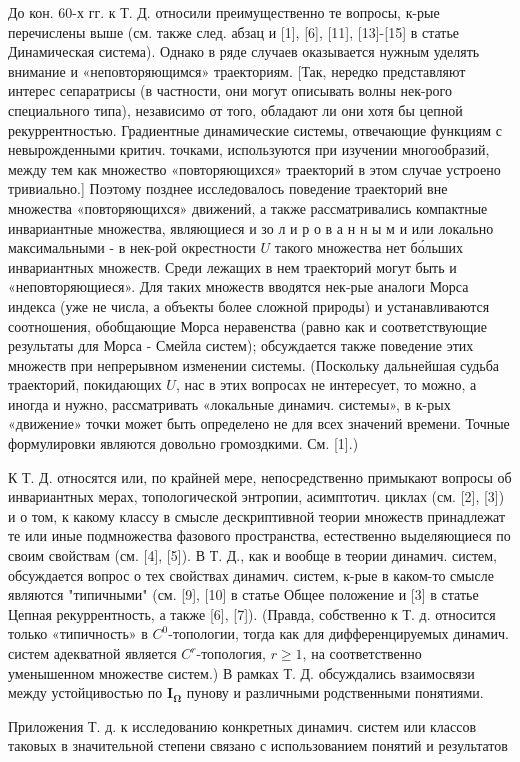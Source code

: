 \documentclass[10pt]{article}
\begin{document}
До кон. 60-х гг. к Т. Д. относили преимущественно те вопросы, к-рые перечислены выше (см. также след. абзац и [1], [6], [11], [13]-[15] в статье Динамическая система). Однако в ряде случаев оказывается нужным уделять внимание и «неповторяющимся» траекториям. [Так, нередко представляют интерес сепаратрисы (в частности, они могут описывать волны нек-рого специального типа), независимо от того, обладают ли они хотя бы цепной рекуррентностью. Градиентные динамические системы, отвечающие функциям с невырожденными критич. точками, используются при изучении многообразий, между тем как множество «повторяющихся» траекторий в этом случае устроено тривиально.] Поэтому позднее исследовалось поведение траекторий вне множества «повторяющихся» движений, а также рассматривались компактные инвариантные множества, являющиеся и зо л и р о в а н н ы м и или локально максимальными - в нек-рой окрестности $U$ такого множества нет бо́льших инвариантных множеств. Среди лежащих в нем траекторий могут быть и «неповторяющиеся». Для таких множеств вводятся нек-рые аналоги Морса индекса (уже не числа, а объекты более сложной природы) и устанавливаются соотношения, обобщающие Морса неравенства (равно как и соответствующие результаты для Морса - Смейла систем); обсуждается также поведение этих множеств при непрерывном изменении системы. (Поскольку дальнейшая судьба траекторий, покидающих $U$, нас в этих вопросах не интересует, то можно, а иногда и нужно, рассматривать «локальные динамич. системы», в к-рых «движение» точки может быть определено не для всех значений времени. Точные формулировки являются довольно громоздкими. См. [1].)



К Т. Д. относятся или, по крайней мере, непосредственно примыкают вопросы об инвариантных мерах, топологической энтропии, асимптотич. циклах (см. [2], [3]) и о том, к какому классу в смысле дескриптивной теории множеств принадлежат те или иные подмножества фазового пространства, естественно выделяющиеся по своим свойствам (см. [4], [5]). В Т. Д., как и вообще в теории динамич. систем, обсуждается вопрос о тех свойствах динамич. систем, к-рые в каком-то смысле являются "типичными" (см. [9], [10] в статье Общее положение и [3] в статье Цепная рекуррентность, а также [6], [7]). (Правда, собственно к Т. д. относится только «типичность» в $C^{0}$-топологии, тогда как для дифференцируемых динамич. систем адекватной является $C^{r}$-топология, $r \geqslant 1$, на соответственно уменышенном множестве систем.) В рамках Т. Д. обсуждались взаимосвязи между устойцивостью по $\boldsymbol{I}_{\boldsymbol{\Omega}}$ пунову и различными родственными понятиями.



Приложения Т. д. к исследованию конкретных динамич. систем или классов таковых в значительной степени связано с использованием понятий и результатов
\end{document}
